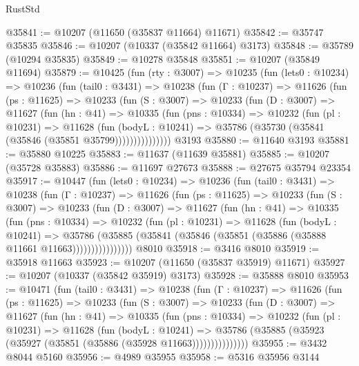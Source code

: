 \begin{lexlean}{RustStd}
\begin{coremodule}
@35841 := @10207 (@11650 (@35837 @11664) @11671)
@35842 := @35747 @35835
@35846 := @10207 (@10337 (@35842 @11664) @3173)
@35848 := @35789 (@10294 @35835)
@35849 := @10278 @35848
@35851 := @10207 (@35849 @11694)
@35879 := @10425
    (fun (rty : @3007) =>
    @10235
      (fun (lets0 : @10234) =>
      @10236
        (fun (tail0 : @3431) =>
        @10238
          (fun (Γ : @10237) =>
          @11626
            (fun (ps : @11625) =>
            @10233
              (fun (S : @3007) =>
              @10233
                (fun (D : @3007) =>
                @11627
                  (fun (hn : @41) =>
                  @10335
                    (fun (pns : @10334) =>
                    @10232
                      (fun (pl : @10231) =>
                      @11628
                        (fun (bodyL : @10241) =>
                        @35786 (@35730 (@35841 (@35846 (@35851 @35799)))))))))))))))
    @3193
@35880 := @11640 @3193
@35881 := @35880 @10225
@35883 := @11637 (@11639 @35881)
@35885 := @10207 (@35728 @35883)
@35886 := @11697 @27673
@35888 := @27675 @35794 @23354
@35917 := @10447
    (fun (lets0 : @10234) =>
    @10236
      (fun (tail0 : @3431) =>
      @10238
        (fun (Γ : @10237) =>
        @11626
          (fun (ps : @11625) =>
          @10233
            (fun (S : @3007) =>
            @10233
              (fun (D : @3007) =>
              @11627
                (fun (hn : @41) =>
                @10335
                  (fun (pns : @10334) =>
                  @10232
                    (fun (pl : @10231) =>
                    @11628
                      (fun (bodyL : @10241) =>
                      @35786
                        (@35885
                          (@35841 (@35846 (@35851 (@35886 (@35888 @11661 @11663))))))))))))))))
    @8010
@35918 := @3416 @8010
@35919 := @35918 @11663
@35923 := @10207 (@11650 (@35837 @35919) @11671)
@35927 := @10207 (@10337 (@35842 @35919) @3173)
@35928 := @35888 @8010
@35953 := @10471
    (fun (tail0 : @3431) =>
    @10238
      (fun (Γ : @10237) =>
      @11626
        (fun (ps : @11625) =>
        @10233
          (fun (S : @3007) =>
          @10233
            (fun (D : @3007) =>
            @11627
              (fun (hn : @41) =>
              @10335
                (fun (pns : @10334) =>
                @10232
                  (fun (pl : @10231) =>
                  @11628
                    (fun (bodyL : @10241) =>
                    @35786 (@35885 (@35923 (@35927 (@35851 (@35886 (@35928 @11663)))))))))))))))
@35955 := @3432 @8044 @5160
@35956 := @4989 @35955
@35958 := @5316 @35956 @3144

\end{coremodule}
\end{lexlean}
